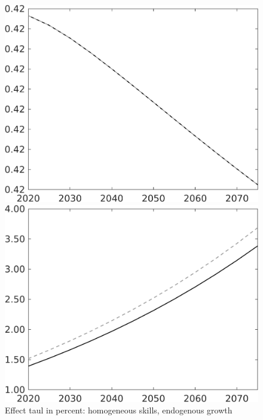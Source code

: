 \documentclass[12pt]{article}
\begin{document}
\begin{figure}[h!!]
	\centering
	\caption{Effect taul in percent: homogeneous skills, endogenous growth}\label{fig:LF_BAU_nsk1_xgr0}
	
	\begin{minipage}[]{0.32\textwidth}
		\includegraphics[width=1\textwidth]{../../codding_model/own_basedOnFried/optimalPol_010922_revision/figures/all_13Sept22/CompTaul_LFBAU_Reg0_EY_spillover0_nsk1_xgr0_knspil0_sep1_countec0_GovRev0_etaa0.79_lgd0.png}
	\end{minipage}	
	\begin{minipage}[]{0.32\textwidth}
		\includegraphics[width=1\textwidth]{../../codding_model/own_basedOnFried/optimalPol_010922_revision/figures/all_13Sept22/CompTaul_LFBAU_Reg0_N_spillover0_nsk1_xgr0_knspil0_sep1_countec0_GovRev0_etaa0.79_lgd0.png}

\end{minipage}
\end{figure}
\end{document}
